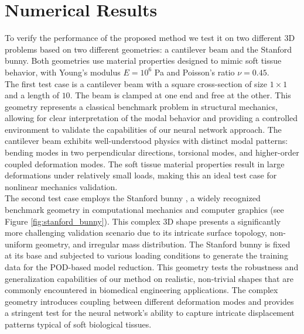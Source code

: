 \section{Numerical Results}
\label{sec:numerical_results}
To verify the performance of the proposed method we test it on two different 3D problems based on two different geometries: a cantilever beam and the Stanford bunny. Both geometries use material properties designed to mimic soft tissue behavior, with Young's modulus $E = 10^6$ Pa and Poisson's ratio $\nu = 0.45$. \\

The first test case is a cantilever beam with a square cross-section of size $1 \times 1$ and a length of $10$. The beam is clamped at one end and free at the other. This geometry represents a classical benchmark problem in structural mechanics, allowing for clear interpretation of the modal behavior and providing a controlled environment to validate the capabilities of our neural network approach. The cantilever beam exhibits well-understood physics with distinct modal patterns: bending modes in two perpendicular directions, torsional modes, and higher-order coupled deformation modes. The soft tissue material properties result in large deformations under relatively small loads, making this an ideal test case for nonlinear mechanics validation. \\

The second test case employs the Stanford bunny \cite{bunny-mesh}, a widely recognized benchmark geometry in computational mechanics and computer graphics (see Figure \ref{fig:stanford_bunny}). This complex 3D shape presents a significantly more challenging validation scenario due to its intricate surface topology, non-uniform geometry, and irregular mass distribution. The Stanford bunny is fixed at its base and subjected to various loading conditions to generate the training data for the POD-based model reduction. This geometry tests the robustness and generalization capabilities of our method on realistic, non-trivial shapes that are commonly encountered in biomedical engineering applications. The complex geometry introduces coupling between different deformation modes and provides a stringent test for the neural network's ability to capture intricate displacement patterns typical of soft biological tissues. 

